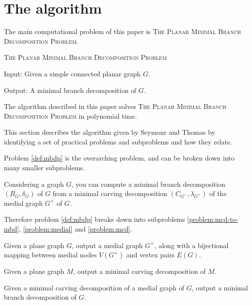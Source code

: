 \documentclass{article}
\begin{document}

\section{The algorithm}

	The main computational problem of this paper is \textsc{The Planar Minimal Branch Decomposition Problem}.

	\begin{definition}\label{def:mbdp}
		\textsc{The Planar Minimal Branch Decomposition Problem}

		Input: Given a simple connected planar graph $G$.

		Output: A minimal branch decomposition of $G$.
	\end{definition}

	The algorithm described in this paper solves \textsc{The Planar Minimal Branch Decomposition Problem} in polynomial time.

	This section describes the algorithm given by Seymour and Thomas\cite{ST93} by identifying a set of practical problems and subproblems and how they relate.
	
	Problem \ref{def:mbdp} is the overarching problem, and can be broken down into many smaller subproblems.

	Considering a graph $G$, you can compute a minimal branch decomposition $(B_G, \delta_G)$ of $G$ from a minimal carving decomposition $(C_{G^\times}, \lambda_{G^\times})$ of the medial graph $G^\times$ of $G$.

	Therefore problem \ref{def:mbdp} breaks down into subproblems \ref{problem:mcd-to-mbd}, \ref{problem:medial} and \ref{problem:mcd}.

	\begin{problem}\label{problem:medial}
		Given a plane graph $G$, output a medial graph $G^\times$, along with a bijectional mapping between medial nodes $V(G^\times)$ and vertex pairs $E(G)$.
	\end{problem}

	\begin{problem}\label{problem:mcd}
		Given a plane graph $M$, output a minimal carving decomposition of $M$.
	\end{problem}

	\begin{problem}\label{problem:mcd-to-mbd}
		Given a minimal carving decomposition of a medial graph of $G$, output a minimal branch decomposition of $G$.
	\end{problem}
\end{document}
